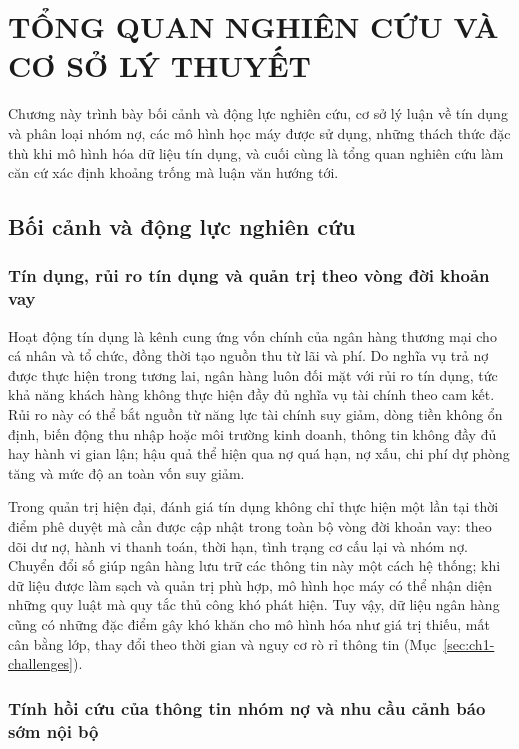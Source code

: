 \chapter{TỔNG QUAN NGHIÊN CỨU VÀ CƠ SỞ LÝ THUYẾT}

Chương này trình bày bối cảnh và động lực nghiên cứu, cơ sở lý luận về tín dụng và phân loại nhóm nợ, các mô hình học máy được sử dụng, những thách thức đặc thù khi mô hình hóa dữ liệu tín dụng, và cuối cùng là tổng quan nghiên cứu làm căn cứ xác định khoảng trống mà luận văn hướng tới.

\section{Bối cảnh và động lực nghiên cứu}

\subsection{Tín dụng, rủi ro tín dụng và quản trị theo vòng đời khoản vay}

Hoạt động tín dụng là kênh cung ứng vốn chính của ngân hàng thương mại cho cá nhân và tổ chức, đồng thời tạo nguồn thu từ lãi và phí. Do nghĩa vụ trả nợ được thực hiện trong tương lai, ngân hàng luôn đối mặt với rủi ro tín dụng, tức khả năng khách hàng không thực hiện đầy đủ nghĩa vụ tài chính theo cam kết. Rủi ro này có thể bắt nguồn từ năng lực tài chính suy giảm, dòng tiền không ổn định, biến động thu nhập hoặc môi trường kinh doanh, thông tin không đầy đủ hay hành vi gian lận; hậu quả thể hiện qua nợ quá hạn, nợ xấu, chi phí dự phòng tăng và mức độ an toàn vốn suy giảm.

Trong quản trị hiện đại, đánh giá tín dụng không chỉ thực hiện một lần tại thời điểm phê duyệt mà cần được cập nhật trong toàn bộ vòng đời khoản vay: theo dõi dư nợ, hành vi thanh toán, thời hạn, tình trạng cơ cấu lại và nhóm nợ. Chuyển đổi số giúp ngân hàng lưu trữ các thông tin này một cách hệ thống; khi dữ liệu được làm sạch và quản trị phù hợp, mô hình học máy có thể nhận diện những quy luật mà quy tắc thủ công khó phát hiện. Tuy vậy, dữ liệu ngân hàng cũng có những đặc điểm gây khó khăn cho mô hình hóa như giá trị thiếu, mất cân bằng lớp, thay đổi theo thời gian và nguy cơ rò rỉ thông tin (Mục~\ref{sec:ch1-challenges}).

\subsection{Tính hồi cứu của thông tin nhóm nợ và nhu cầu cảnh báo sớm nội bộ}
\label{sec:cic-limits}

